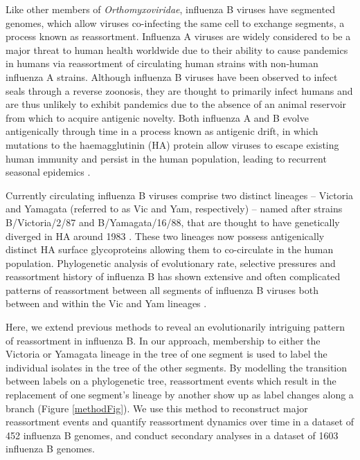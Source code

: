 \documentclass[11pt,oneside,letterpaper]{article}
\begin{document}
Like other members of \textit{Orthomyxoviridae}, influenza B viruses have segmented genomes, which allow viruses co-infecting the same cell to exchange segments, a process known as reassortment. 
Influenza A viruses are widely considered to be a major threat to human health worldwide due to their ability to cause pandemics in humans via reassortment of circulating human strains with non-human influenza A strains. 
Although influenza B viruses have been observed to infect seals \citep{osterhaus2000,bodewes2013} through a reverse zoonosis, they are thought to primarily infect humans and are thus unlikely to exhibit pandemics due to the absence of an animal reservoir from which to acquire antigenic novelty. 
Both influenza A and B evolve antigenically through time in a process known as antigenic drift, in which mutations to the haemagglutinin (HA) protein allow viruses to escape existing human immunity and persist in the human population, leading to recurrent seasonal epidemics \citep{burnet1955,hay2001,bedford2014}.

Currently circulating influenza B viruses comprise two distinct lineages -- Victoria and Yamagata (referred to as Vic and Yam, respectively) -- named after strains B/Victoria/2/87 and B/Yamagata/16/88, that are thought to have genetically diverged in HA around 1983 \citep{rota1990}. 
These two lineages now possess antigenically distinct HA surface glycoproteins \citep{kanegae1990,rota1990,nerome1998,nakagawa2002,ansaldi2003} allowing them to co-circulate in the human population.
Phylogenetic analysis of evolutionary rate, selective pressures and reassortment history of influenza B has shown extensive and often complicated patterns of reassortment between all segments of influenza B viruses both between and within the Vic and Yam lineages \citep{chen2008}.

Here, we extend previous methods to reveal an evolutionarily intriguing pattern of reassortment in influenza B.
In our approach, membership to either the Victoria or Yamagata lineage in the tree of one segment is used to label the individual isolates in the tree of the other segments.
By modelling the transition between labels on a phylogenetic tree, reassortment events which result in the replacement of one segment's lineage by another show up as label changes along a branch (Figure \ref{methodFig}).
We use this method to reconstruct major reassortment events and quantify reassortment dynamics over time in a dataset of 452 influenza B genomes, and conduct secondary analyses in a dataset of 1603 influenza B genomes.
\end{document}
